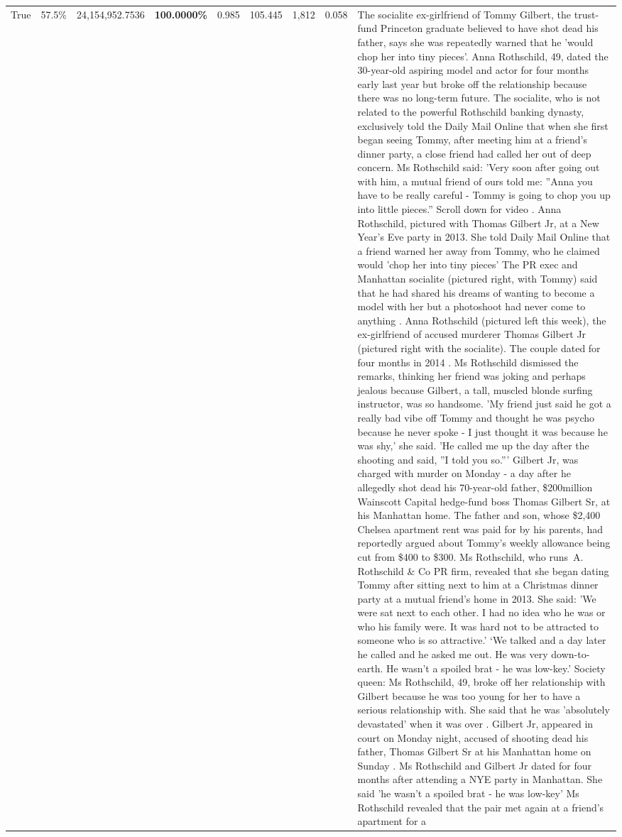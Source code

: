 \begin{table}[H]
\begin{tabular}{lllrlllll}
True & 57.5\% & 24,154,952.7536 & \bfseries \color{red} 100.0000\% & 0.985 & 105.445 & 1,812 & 0.058 & The socialite ex-girlfriend of Tommy Gilbert, the trust-fund Princeton graduate believed to have shot dead his father, says she was repeatedly warned that he 'would chop her into tiny pieces'. Anna Rothschild, 49, dated the 30-year-old aspiring model and actor for four months early last year but broke off the relationship because there was no long-term future. The socialite, who is not related to the powerful Rothschild banking dynasty, exclusively told the Daily Mail Online that when she first began seeing Tommy, after meeting him at a friend's dinner party, a close friend had called her out of deep concern. Ms Rothschild said: 'Very soon after going out with him, a mutual friend of ours told me: ''Anna you have to be really careful - Tommy is going to chop you up into little pieces.'' Scroll down for video . Anna Rothschild, pictured with Thomas Gilbert Jr, at a New Year's Eve party in 2013. She told Daily Mail Online that a friend warned her away from Tommy, who he claimed would 'chop her into tiny pieces' The PR exec and Manhattan socialite (pictured right, with Tommy) said that he had shared his dreams of wanting to become a model with her but a photoshoot had never come to anything . Anna Rothschild (pictured left this week), the ex-girlfriend of accused murderer Thomas Gilbert Jr (pictured right with the socialite). The couple dated for four months in 2014 . Ms Rothschild dismissed the remarks, thinking her friend was joking and perhaps jealous because Gilbert, a tall, muscled blonde surfing instructor, was so handsome. 'My friend just said he got a really bad vibe off Tommy and thought he was psycho because he never spoke - I just thought it was because he was shy,' she said. 'He called me up the day after the shooting and said, ''I told you so.''' Gilbert Jr, was charged with murder on Monday - a day after he allegedly shot dead his 70-year-old father, \$200million Wainscott Capital hedge-fund boss Thomas Gilbert Sr, at his Manhattan home. The father and son, whose \$2,400 Chelsea apartment rent was paid for by his parents, had reportedly argued about Tommy's weekly allowance being cut from \$400 to \$300. Ms Rothschild, who runs A. Rothschild \& Co PR firm, revealed that she began dating Tommy after sitting next to him at a Christmas dinner party at a mutual friend's home in 2013. She said: 'We were sat next to each other. I had no idea who he was or who his family were. It was hard not to be attracted to someone who is so attractive.' ‘We talked and a day later he called and he asked me out. He was very down-to-earth. He wasn’t a spoiled brat - he was low-key.’ Society queen: Ms Rothschild, 49, broke off her relationship with Gilbert because he was too young for her to have a serious relationship with. She said that he was 'absolutely devastated' when it was over . Gilbert Jr, appeared in court on Monday night, accused of shooting dead his father, Thomas Gilbert Sr at his Manhattan home on Sunday . Ms Rothschild and Gilbert Jr dated for four months after attending a NYE party in Manhattan. She said 'he wasn't a spoiled brat - he was low-key' Ms Rothschild revealed that the pair met again at a friend’s apartment for a 
\end{tabular}
\end{table}
